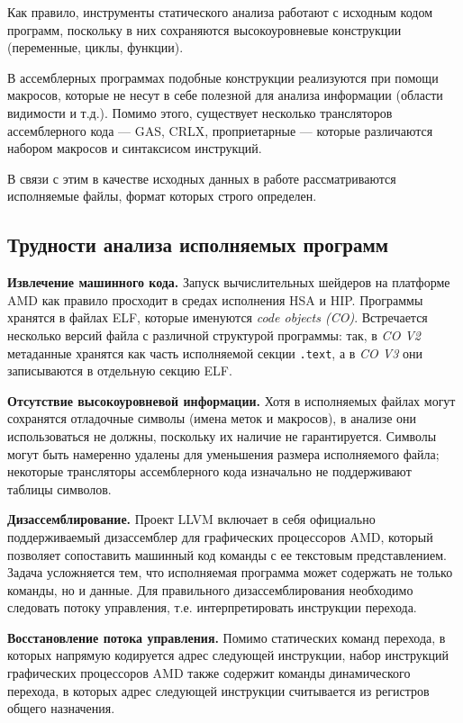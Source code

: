 \documentclass[a4paper,14pt]{extarticle}
\newcommand{\topic}[2]{\textbf{#1.} #2\newline}
\begin{document}
Как правило, инструменты статического анализа работают с исходным кодом программ,
поскольку в них сохраняются высокоуровневые конструкции (переменные, циклы, функции).

В ассемблерных программах подобные конструкции реализуются при помощи макросов,
которые не несут в себе полезной для анализа информации (области видимости и т.д.).
Помимо этого, существует несколько трансляторов ассемблерного кода — GAS, CRLX, проприетарные — которые
различаются набором макросов и синтаксисом инструкций.

В связи с этим в качестве исходных данных в работе рассматриваются исполняемые файлы,
формат которых строго определен.

\subsection{Трудности анализа исполняемых программ}

\topic{Извлечение машинного кода}{Запуск вычислительных шейдеров на платформе AMD как правило просходит
в средах исполнения HSA и HIP. Программы хранятся в файлах ELF, которые именуются \textit{code objects (CO)}.
Встречается несколько версий файла с различной структурой программы: так,
в \textit{CO V2} метаданные хранятся как часть исполняемой секции \texttt{.text}, а
в \textit{CO V3} они записываются в отдельную секцию ELF.}

\topic{Отсутствие высокоуровневой информации}{Хотя в исполняемых файлах могут сохранятся отладочные символы
(имена меток и макросов), в анализе они использоваться не должны, поскольку их наличие не гарантируется.
Символы могут быть намеренно удалены для уменьшения размера исполняемого файла;
некоторые трансляторы ассемблерного кода изначально не поддерживают таблицы символов.}

\topic{Дизассемблирование}{Проект LLVM включает в себя официально поддерживаемый дизассемблер
для графических процессоров AMD, который позволяет сопоставить машинный код команды с ее текстовым
представлением. Задача усложняется тем, что исполняемая программа может содержать не только команды,
но и данные. Для правильного дизассемблирования необходимо следовать потоку управления,
т.е. интерпретировать инструкции перехода.}

\topic{Восстановление потока управления}{Помимо статических команд перехода, в которых напрямую
кодируется адрес следующей инструкции, набор инструкций графических процессоров AMD также содержит
команды динамического перехода, в которых адрес следующей инструкции считывается из регистров
общего назначения.}
\end{document}
